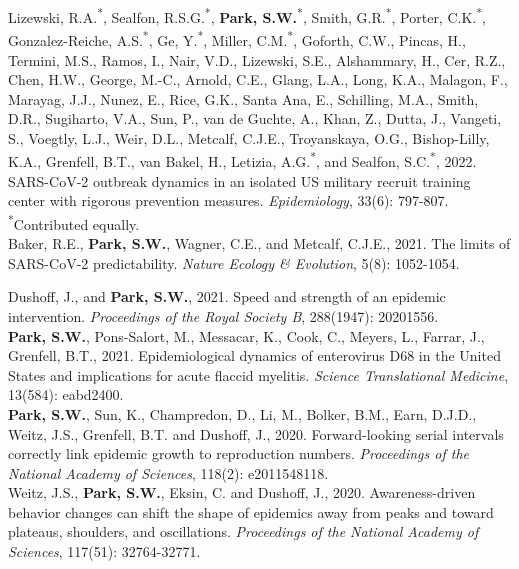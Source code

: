 \documentclass[11pt]{article} %
\begin{document}
 Lizewski, R.A.\textsuperscript{*}, Sealfon, R.S.G.\textsuperscript{*}, \textbf{Park, S.W.}\textsuperscript{*}, Smith, G.R.\textsuperscript{*}, Porter, C.K.\textsuperscript{*}, Gonzalez-Reiche, A.S.\textsuperscript{*}, Ge, Y.\textsuperscript{*}, Miller, C.M.\textsuperscript{*}, Goforth, C.W., Pincas, H., Termini, M.S., Ramos, I., Nair, V.D., Lizewski, S.E., Alshammary, H., Cer, R.Z., Chen, H.W., George, M.-C., Arnold, C.E., Glang, L.A., Long, K.A., Malagon, F., Marayag, J.J., Nunez, E., Rice, G.K., Santa Ana, E., Schilling, M.A., Smith, D.R., Sugiharto, V.A., Sun, P., van de Guchte, A., Khan, Z., Dutta, J., Vangeti, S., Voegtly, L.J., Weir, D.L., Metcalf, C.J.E., Troyanskaya, O.G., Bishop-Lilly, K.A., Grenfell, B.T., van Bakel, H., Letizia, A.G.\textsuperscript{*}, and Sealfon, S.C.\textsuperscript{*}, 2022. SARS-CoV-2 outbreak dynamics in an isolated US military recruit training center with rigorous prevention measures. \textit{Epidemiology}, 33(6): 797-807.\\
\textsuperscript{*}Contributed equally.\\

 Baker, R.E., \textbf{Park, S.W.}, Wagner, C.E., and Metcalf, C.J.E., 2021. The limits of SARS-CoV-2 predictability. \textit{Nature Ecology \& Evolution}, 5(8): 1052-1054.

 Dushoff, J., and \textbf{Park, S.W.}, 2021. Speed and strength of an epidemic intervention. \textit{Proceedings of the Royal Society B}, 288(1947): 20201556.\\

 \textbf{Park, S.W.}, Pons-Salort, M., Messacar, K., Cook, C., Meyers, L., Farrar, J., Grenfell, B.T., 2021. Epidemiological dynamics of enterovirus D68 in the United States and implications for acute flaccid myelitis. \textit{Science Translational Medicine}, 13(584): eabd2400.\\

 \textbf{Park, S.W.}, Sun, K., Champredon, D., Li, M., Bolker, B.M., Earn, D.J.D., Weitz, J.S., Grenfell, B.T. and Dushoff, J., 2020. Forward-looking serial intervals correctly link epidemic growth to reproduction numbers. \textit{Proceedings of the National Academy of Sciences}, 118(2): e2011548118.\\

 Weitz, J.S., \textbf{Park, S.W.}, Eksin, C. and Dushoff, J., 2020. Awareness-driven behavior changes can shift the shape of epidemics away from peaks and toward plateaus, shoulders, and oscillations. \textit{Proceedings of the National Academy of Sciences}, 117(51): 32764-32771.\\
\end{document}
